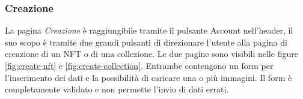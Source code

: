 \subsubsection{Creazione}
\label{sec:creazione}

La pagina \textit{Creazione} è raggiungibile tramite il pulsante Account nell'header, il suo scopo è tramite due grandi pulsanti di direzionare l'utente alla pagina di creazione di un NFT o di una collezione. Le due pagine sono visibili nelle figure \ref{fig:create-nft} e \ref{fig:create-collection}. Entrambe contengono un form per l'inserimento dei dati e la possibilità di caricare una o più immagini. Il form è completamente validato e non permette l'invio di dati errati. 

\begin{figure}[H]
    \begin{minipage}{0.7\textwidth}
      \centering
    \end{minipage}
    \hfill
    \begin{minipage}{0.26\textwidth }
      \centering

\end{minipage}
\end{figure}
